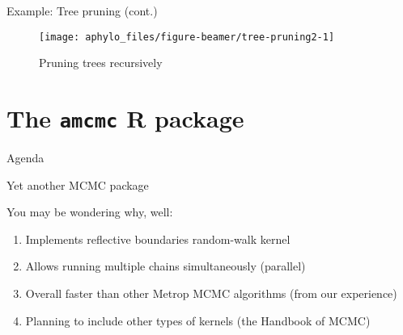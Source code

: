 \documentclass[9pt,ignorenonframetext,]{beamer}
\begin{document}
\begin{frame}[t]{Example: Tree pruning (cont.)}

\footnotesize

\begin{figure}

{\centering \texttt{[image: aphylo\_files/figure-beamer/tree-pruning2-1]} 

}

\caption{Pruning trees recursively}\label{fig:tree-pruning2}
\end{figure}

\normalsize

\end{frame}

\section{\texorpdfstring{The \texttt{amcmc} R
package}{The amcmc R package}}\label{the-amcmc-r-package}

\begin{frame}{Agenda}

\tableofcontents[currentsection]

\end{frame}

\begin{frame}{Yet another MCMC package}

You may be wondering why, well:

\begin{enumerate}
\def\labelenumi{\arabic{enumi}.}
\item
  Implements reflective boundaries random-walk kernel
\item
  Allows running multiple chains simultaneously (parallel)
\item
  Overall faster than other Metrop MCMC algorithms (from our experience)
\item
  Planning to include other types of kernels (the Handbook of MCMC)
\end{enumerate}

\end{frame}
\end{document}
